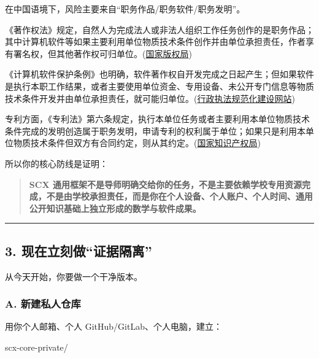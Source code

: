 \documentclass[
  12pt,
]{ctexart}
\newenvironment{Shaded}{}{}
\newcommand{\NormalTok}[1]{#1}
\begin{document}
在中国语境下，风险主要来自``职务作品/职务软件/职务发明''。

《著作权法》规定，自然人为完成法人或非法人组织工作任务创作的是职务作品；其中计算机软件等如果主要利用单位物质技术条件创作并由单位承担责任，作者享有署名权，但其他著作权可归单位。(\href{https://arxiv.org/html/2406.17557v1?utm_source=chatgpt.com}{国家版权局})

《计算机软件保护条例》也明确，软件著作权自开发完成之日起产生；但如果软件是执行本职工作结果，或者主要使用单位资金、专用设备、未公开专门信息等物质技术条件开发并由单位承担责任，就可能归单位。(\href{https://arxiv.org/abs/2501.07314?utm_source=chatgpt.com}{行政执法规范化建设网站})

专利方面，《专利法》第六条规定，执行本单位任务或者主要利用本单位物质技术条件完成的发明创造属于职务发明，申请专利的权利属于单位；如果只是利用本单位物质技术条件但双方有合同约定，则从其约定。(\href{https://arxiv.org/abs/2505.05427?utm_source=chatgpt.com}{国家知识产权局})

所以你的核心防线是证明：

\begin{quote}
\textbf{SCX
通用框架不是导师明确交给你的任务，不是主要依赖学校专用资源完成，不是由学校承担责任，而是你在个人设备、个人账户、个人时间、通用公开知识基础上独立形成的数学与软件成果。}
\end{quote}

\begin{center}\rule{0.5\linewidth}{0.5pt}\end{center}

\subsection{3.
现在立刻做``证据隔离''}\label{ux73b0ux5728ux7acbux523bux505aux8bc1ux636eux9694ux79bb}

从今天开始，你要做一个干净版本。

\subsubsection{A.
新建私人仓库}\label{a.-ux65b0ux5efaux79c1ux4ebaux4ed3ux5e93}

用你个人邮箱、个人 GitHub/GitLab、个人电脑，建立：

\begin{Shaded}
\begin{Highlighting}[]
\NormalTok{scx{-}core{-}private/}
\end{Highlighting}
\end{Shaded}
\end{document}

